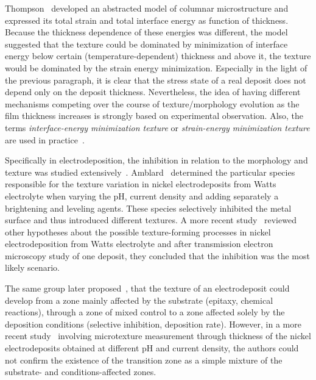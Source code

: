 Thompson~\cite{Thompson1993} developed an abstracted model of columnar microstructure and expressed its total strain and total interface energy as function of thickness. Because the thickness dependence of these energies was different, the model suggested that the texture could be dominated by minimization of interface energy below certain (temperature-dependent) thickness and above it, the texture would be dominated by the strain energy minimization. Especially in the light of the previous paragraph, it is clear that the stress state of a real deposit does not depend only on the deposit thickness. Nevertheless, the idea of having different mechanisms competing over the course of texture/morphology evolution as the film thickness increases is strongly based on experimental observation. Also, the terms \textit{interface-energy minimization texture} or \textit{strain-energy minimization texture} are used in practice~\cite{Alimadadi2016}.

Specifically in electrodeposition, the inhibition in relation to the morphology and texture was studied extensively~\cite{Winand1992}. Amblard~\cite{Amblard1979} determined the particular species responsible for the texture variation in nickel electrodeposits from Watts electrolyte when varying the pH, current density and adding separately a brightening and leveling agents. These species selectively inhibited the metal surface and thus introduced different textures. A more recent study~\cite{BergenstofNielsen1997} reviewed other hypotheses about the possible texture-forming processes in nickel electrodeposition from Watts electrolyte and after transmission electron microscopy study of one deposit, they concluded that the inhibition was the most likely scenario. 

The same group later proposed~\cite{Rasmussen2001}, that the texture of an electrodeposit could develop from a zone mainly affected by the substrate (epitaxy, chemical reactions), through a zone of mixed control to a zone affected solely by the deposition conditions (selective inhibition, deposition rate). However, in a more recent study~\cite{Alimadadi2016} involving microtexture measurement through thickness of the nickel electrodeposits obtained at different pH and current density, the authors could not confirm the existence of the transition zone as a simple mixture of the substrate- and conditions-affected zones. 


%


